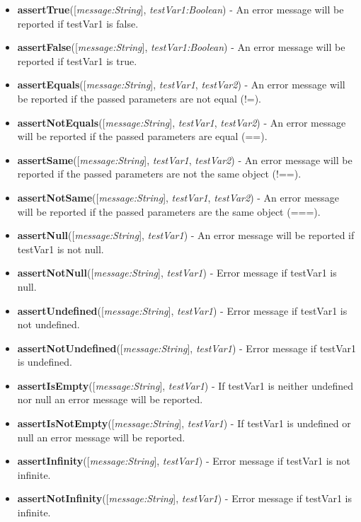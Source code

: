 \begin{itemize}
	\item \textbf{assertTrue}([\textit{message:String}], \textit{testVar1:Boolean}) - An error message will be reported if testVar1 is false.
	\item \textbf{assertFalse}([\textit{message:String}],\textit{ testVar1:Boolean}) - An error message will be reported if testVar1 is true.
	\item \textbf{assertEquals}([\textit{message:String}], \textit{testVar1}, \textit{testVar2}) - An error message will be reported if the passed parameters are not equal (!=).
	\item \textbf{assertNotEquals}([\textit{message:String}], \textit{testVar1}, \textit{testVar2}) - An error message will be reported if the passed parameters are equal (==).
	\item \textbf{assertSame}([\textit{message:String}], \textit{testVar1}, \textit{testVar2}) - An error message will be reported if the passed parameters are not the same object (!==).
	\item \textbf{assertNotSame}([\textit{message:String}], \textit{testVar1}, \textit{testVar2}) - An error message will be reported if the passed parameters are the same object (===).
	\item \textbf{assertNull}([\textit{message:String}], \textit{testVar1}) - An error message will be reported if testVar1 is not null.
	\item \textbf{assertNotNull}([\textit{message:String}], \textit{testVar1}) - Error message if testVar1 is null.
	\item \textbf{assertUndefined}([\textit{message:String}], \textit{testVar1}) - Error message if testVar1 is not undefined.
	\item \textbf{assertNotUndefined}([\textit{message:String}], \textit{testVar1}) - Error message if testVar1 is undefined.
	\item \textbf{assertIsEmpty}([\textit{message:String}], \textit{testVar1}) - If testVar1 is neither undefined nor null an error message will be reported.
	\item \textbf{assertIsNotEmpty}([\textit{message:String}], \textit{testVar1}) - If testVar1 is undefined or null an error message will be reported.
	\item \textbf{assertInfinity}([\textit{message:String}], \textit{testVar1}) - Error message if testVar1 is not infinite.
	\item \textbf{assertNotInfinity}([\textit{message:String}], \textit{testVar1}) - Error message if testVar1 is infinite.

\end{itemize}
